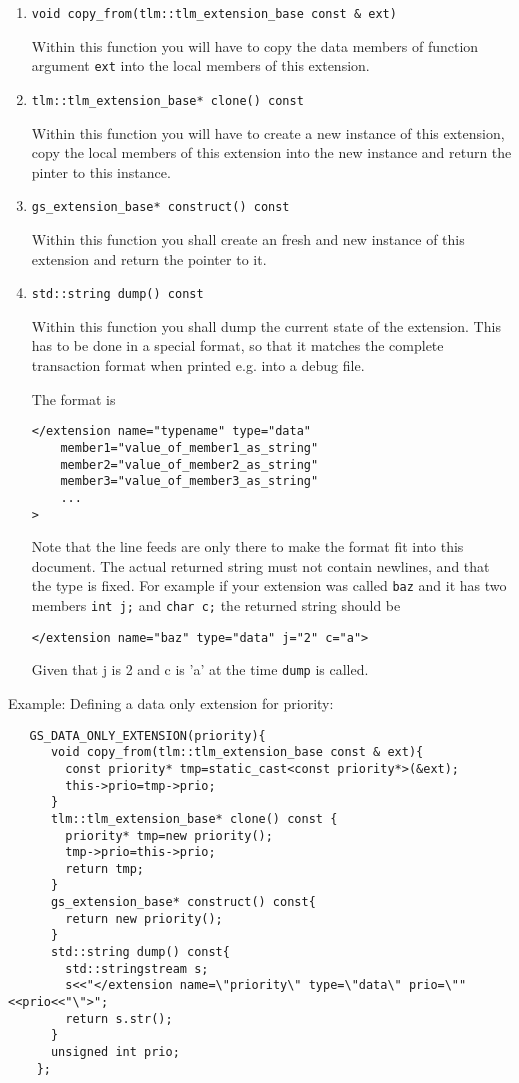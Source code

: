 \documentclass[a4paper,10pt]{article}          %
\begin{document}
\begin{enumerate}
\item 
\verb|void copy_from(tlm::tlm_extension_base const & ext)|

Within this function you will have to copy the data members of function argument \verb|ext| into the local members of this extension.

\item 
\verb|tlm::tlm_extension_base* clone() const|

Within this function you will have to create a new instance of this extension, copy the local members of this extension into the new instance and return the pinter to this instance.

\item
\verb|gs_extension_base* construct() const|

Within this function you shall create an fresh and new instance of this extension and return the pointer to it.

\item
\verb|std::string dump() const|

Within this function you shall dump the current state of the extension. This has to be done in a special format, so that it matches the complete transaction format when printed e.g. into a debug file.

The format is

\begin{verbatim}
</extension name="typename" type="data" 
	member1="value_of_member1_as_string" 
	member2="value_of_member2_as_string" 
	member3="value_of_member3_as_string" 
	...
>
\end{verbatim}

Note that the line feeds are only there to make the format fit into this document. The actual returned string must not contain newlines, and that the type is fixed. For example if your extension was called \verb|baz| and it has two members \verb|int j;| and \verb|char c;| the returned string should be 

\verb|</extension name="baz" type="data" j="2" c="a">|

Given that j is 2 and c is 'a' at the time \verb|dump| is called.
\end{enumerate}

Example: Defining a data only extension for priority:

\begin{small}
\begin{verbatim}
   GS_DATA_ONLY_EXTENSION(priority){
      void copy_from(tlm::tlm_extension_base const & ext){
        const priority* tmp=static_cast<const priority*>(&ext);
        this->prio=tmp->prio;
      }
      tlm::tlm_extension_base* clone() const {
        priority* tmp=new priority(); 
        tmp->prio=this->prio; 
        return tmp;
      }
      gs_extension_base* construct() const{
        return new priority();
      }
      std::string dump() const{
        std::stringstream s;
        s<<"</extension name=\"priority\" type=\"data\" prio=\""<<prio<<"\">";
        return s.str();
      }
      unsigned int prio;
    };
\end{verbatim}
\end{small}
\end{document}
